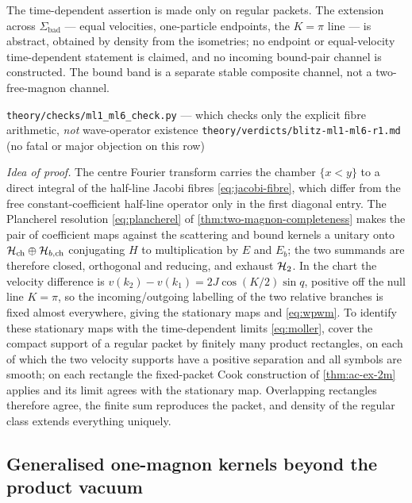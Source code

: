 \begin{scope}
The time-dependent assertion is made only on regular packets. The extension
across $\Sigma_{\mathrm{bad}}$ --- equal velocities, one-particle endpoints,
the $K=\pi$ line --- is abstract, obtained by density from the isometries; no
endpoint or equal-velocity time-dependent statement is claimed, and no
incoming bound-pair channel is constructed. The bound band is a separate
stable composite channel, not a two-free-magnon channel.
\end{scope}
%
{\texttt{theory/checks/ml1\_ml6\_check.py} --- which checks only the explicit
fibre arithmetic, \emph{not} wave-operator existence}%
{\texttt{theory/verdicts/blitz-ml1-ml6-r1.md} (no fatal or major objection on
this row)}

\emph{Idea of proof.} The centre Fourier transform carries the chamber
$\{x<y\}$ to a direct integral of the half-line Jacobi fibres
\cref{eq:jacobi-fibre}, which differ from the free constant-coefficient
half-line operator only in the first diagonal entry. The Plancherel resolution
\cref{eq:plancherel} of \cref{thm:two-magnon-completeness} makes the pair of
coefficient maps against the scattering and bound kernels a unitary onto
$\mathcal{H}_{\mathrm{ch}}\oplus\mathcal{H}_{b,\mathrm{ch}}$ conjugating $H$ to
multiplication by $E$ and $E_b$; the two summands are therefore closed,
orthogonal and reducing, and exhaust $\mathcal{H}_2$. In the chart the velocity
difference is $v(k_2)-v(k_1)=2J\cos(K/2)\sin q$, positive off the null line
$K=\pi$, so the incoming/outgoing labelling of the two relative branches is
fixed almost everywhere, giving the stationary maps and \cref{eq:wpwm}. To
identify these stationary maps with the time-dependent limits
\cref{eq:moller}, cover the compact support of a regular packet by finitely
many product rectangles, on each of which the two velocity supports have a
positive separation and all symbols are smooth; on each rectangle the
fixed-packet Cook construction of \cref{thm:ac-ex-2m} applies and its limit
agrees with the stationary map. Overlapping rectangles therefore agree, the
finite sum reproduces the packet, and density of the regular class extends
everything uniquely.

\subsection{Generalised one-magnon kernels beyond the product vacuum}

